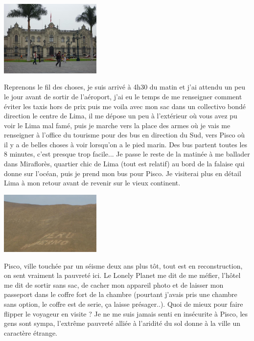 \begin{multicols}{2}
\smallbreak
\hspace*{-0.65cm}
\includegraphics[width=5cm]{articles/Cote-du-sud/1255996660JAoN.jpg}
\smallbreak

Reprenons le fil des choses, je suis arrivé à 4h30 du matin et j'ai attendu un peu le jour avant de sortir de l'aéroport, j'ai eu le temps de me renseigner comment éviter les taxis hors de prix puis me voila avec mon sac dans un collectivo bondé direction le centre de Lima, il me dépose un peu  à l'extérieur où vous avez pu voir le Lima mal famé, puis je marche vers la place des armes où je vais me renseigner à l'office du tourisme pour des bus en direction du Sud, vers Pisco où il y a de belles choses à voir lorsqu'on a le pied marin. Des bus partent toutes les 8 minutes, c'est presque trop facile... Je passe le reste de la matinée à me ballader dans Miraflorès, quartier chic de Lima (tout est relatif) au bord de la falaise qui donne sur l'océan, puis je prend mon bus pour Pisco. Je visiterai plus en détail Lima à mon retour avant de revenir sur le vieux continent.

\smallbreak
\hspace*{-0.65cm}
\includegraphics[width=5cm]{articles/Cote-du-sud/1255996643RUpx.jpg}
\smallbreak

Pisco, ville touchée par un séisme deux ans plus tôt, tout est en reconstruction, on sent vraiment la pauvreté ici. Le Lonely Planet me dit de me méfier, l'hôtel me dit de sortir sans sac, de cacher mon appareil photo et de laisser mon passeport dans le coffre fort de la chambre (pourtant j'avais pris une chambre sans option, le coffre est de serie, ça laisse présager..). Quoi de mieux pour faire flipper le voyageur en visite ? Je ne me suis jamais senti en insécurite à Pisco, les gens sont sympa, l'extrême pauvreté alliée à l'aridité du sol donne à la ville un caractère étrange.


\end{multicols}
